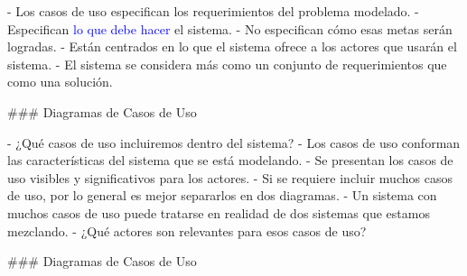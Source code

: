 
- Los casos de uso especifican los requerimientos del problema modelado.
- Especifican \textcolor{blue}{lo que debe hacer} el sistema.
- No especifican cómo esas metas serán logradas.
- Están centrados en lo que el sistema ofrece a los actores que usarán el sistema.
- El sistema se considera más como un conjunto de requerimientos que como una solución.

### Diagramas de Casos de Uso


- ¿Qué casos de uso incluiremos dentro del sistema?
    - Los casos de uso conforman las características del sistema que se está modelando.
    - Se presentan los casos de uso visibles y significativos para los actores.
    - Si se requiere incluir muchos casos de uso, por lo general es mejor separarlos en dos diagramas.
    - Un sistema con muchos casos de uso puede tratarse en realidad de dos sistemas que estamos mezclando.
- ¿Qué actores son relevantes para esos casos de uso?

### Diagramas de Casos de Uso


\exUseCaseB

